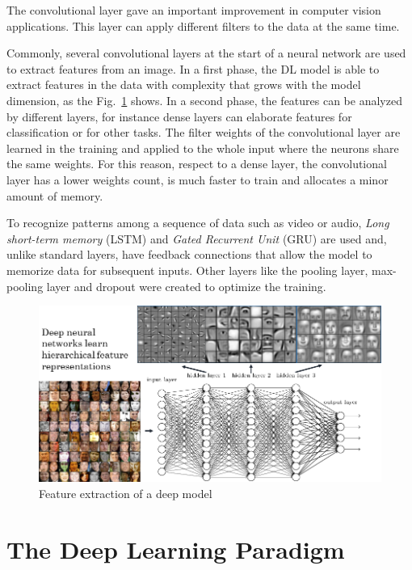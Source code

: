 \documentclass[12pt]{report}
\begin{document}
The convolutional layer gave an important improvement in computer vision applications. This layer can apply different filters to the data at the same time.

Commonly, several convolutional layers at the start of a neural network are used to extract features from an image. 
In a first phase, the DL model is able to extract features in the data with complexity that grows with the model dimension, as the Fig.~\ref{fig:featuresextract} shows.
In a second phase, the features can be analyzed by different layers, for instance dense layers can elaborate features for classification or for other tasks.
The filter weights of the convolutional layer are learned in the training and applied to the whole input where the neurons share the same weights. 
For this reason, respect to a dense layer, the convolutional layer has a lower weights count, is much faster to train and allocates a minor amount of memory.

To recognize patterns among a sequence of data such as video or audio, \textit{Long short-term memory} (LSTM) \cite{lstm}  and \textit{Gated Recurrent Unit} (GRU) \cite{gru} are used
and, unlike standard layers, have feedback connections that allow the model to memorize data for subsequent inputs.
Other layers like the pooling layer, max-pooling layer and dropout were created to optimize the training.


\begin{figure}[t]
    \centering
    \includegraphics[scale=.5]{layers-features.png}
    \caption{Feature extraction of a deep model \cite{featuresextract}}
    \label{fig:featuresextract}
\end{figure}


\section{The Deep Learning Paradigm}
\end{document}
